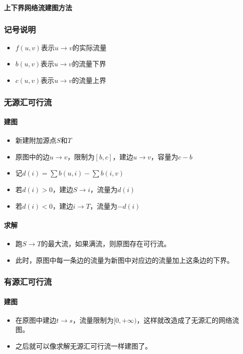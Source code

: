 \textbf{上下界网络流建图方法}
\subsubsection*{记号说明}
\begin{itemize}
\item $f(u,v)$表示$u \rightarrow v$的实际流量
\item $b(u,v)$表示$u \rightarrow v$的流量下界
\item $c(u,v)$表示$u \rightarrow v$的流量上界
\end{itemize}

\subsubsection*{无源汇可行流}
\paragraph{建图}
\begin{itemize}
\item 新建附加源点$S$和$T$
\item 原图中的边$u \rightarrow v$，限制为$[b,c]$，建边$u \rightarrow v$，容量为$c-b$
\item 记$d(i) = \sum b(u,i) - \sum b(i,v) $
\item 若$d(i)>0$，建边$S \rightarrow i$，流量为$d(i)$
\item 若$d(i)<0$，建边$i \rightarrow T$，流量为$-d(i)$
\end{itemize}

\paragraph{求解}
\begin{itemize}
\item 跑$S \rightarrow T$的最大流，如果满流，则原图存在可行流。
\item 此时，原图中每一条边的流量为新图中对应边的流量加上这条边的下界。
\end{itemize}

\subsubsection*{有源汇可行流}
\paragraph{建图}
\begin{itemize}
\item 在原图中建边$t \rightarrow s$，流量限制为$[0,+\infty)$，这样就改造成了无源汇的网络流图。
\item 之后就可以像求解无源汇可行流一样建图了。
\end{itemize}

